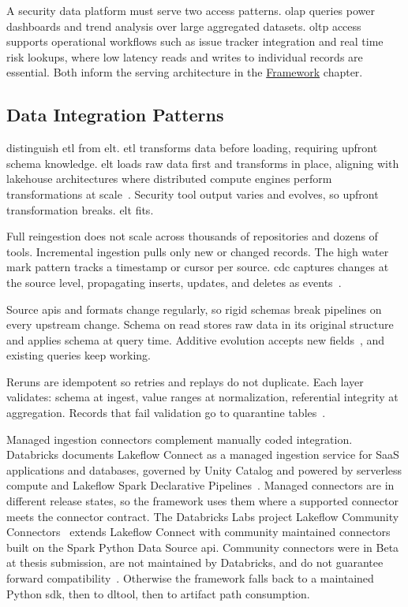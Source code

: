 A security data platform must serve two access patterns. \Gls{olap} queries power dashboards and trend analysis over large aggregated datasets. \Gls{oltp} access supports operational workflows such as issue tracker integration and real time risk lookups, where low latency reads and writes to individual records are essential. Both inform the serving architecture in the \hyperref[ch:framework]{Framework} chapter.


\subsection{Data Integration Patterns}
\label{sec:data-integration-patterns}

\textcite{Reis2022} distinguish \gls{etl} from \gls{elt}. \Gls{etl} transforms data before loading, requiring upfront schema knowledge. \Gls{elt} loads raw data first and transforms in place, aligning with lakehouse architectures where distributed compute engines perform transformations at scale~\cite{Thalpati2024}. Security tool output varies and evolves, so upfront transformation breaks. \Gls{elt} fits.

Full reingestion does not scale across thousands of repositories and dozens of tools. Incremental ingestion pulls only new or changed records. The high water mark pattern tracks a timestamp or cursor per source. \Gls{cdc} captures changes at the source level, propagating inserts, updates, and deletes as events~\cite{Reis2022}.

Source \glspl{api} and formats change regularly, so rigid schemas break pipelines on every upstream change. Schema on read stores raw data in its original structure and applies schema at query time. Additive evolution accepts new fields~\cite{Lee2024}, and existing queries keep working.

Reruns are idempotent so retries and replays do not duplicate. Each layer validates: schema at ingest, value ranges at normalization, referential integrity at aggregation. Records that fail validation go to quarantine tables~\cite{DAMA2017}.

Managed ingestion connectors complement manually coded integration. Databricks documents Lakeflow Connect as a managed ingestion service for SaaS applications and databases, governed by Unity Catalog and powered by serverless compute and Lakeflow Spark Declarative Pipelines~\cite{DatabricksLakeflowConnect2025}. Managed connectors are in different release states, so the framework uses them where a supported connector meets the connector contract. The Databricks Labs project Lakeflow Community Connectors~\cite{DatabricksLakeflowCommunityConnectors2026} extends Lakeflow Connect with community maintained connectors built on the Spark Python Data Source \gls{api}. Community connectors were in Beta at thesis submission, are not maintained by Databricks, and do not guarantee forward compatibility~\cite{DatabricksLakeflowCommunityConnectorsDocs2026}. Otherwise the framework falls back to a maintained Python \gls{sdk}, then to \gls{dltool}, then to artifact path consumption.

